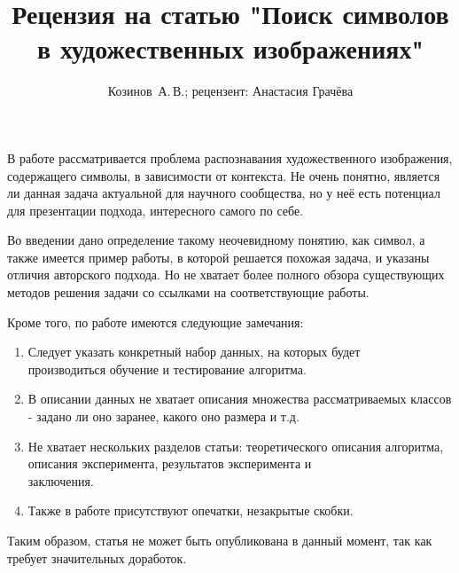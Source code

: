 \documentclass[12pt,twoside]{article}
\title{Рецензия на статью "Поиск символов в художественных изображениях"}
\author{Козинов~А.\,В.; рецензент: Анастасия Грачёва}
\begin{document}
	\maketitle
	В работе рассматривается проблема распознавания художественного изображения, содержащего символы, в зависимости от контекста. Не очень понятно, является ли данная задача актуальной для научного сообщества, но у неё есть потенциал для презентации подхода, интересного самого по себе.
	
	Во введении дано определение такому неочевидному понятию, как символ, а также имеется
	пример работы, в которой решается похожая задача, и указаны отличия авторского подхода.  Но не хватает более полного обзора существующих методов решения задачи со ссылками на соответствующие работы.
	
	Кроме того, по работе имеются следующие замечания:
	\begin{enumerate}
	\item Следует указать конкретный набор данных, на которых будет \\
	производиться обучение и
	тестирование алгоритма.
	\item В описании данных не хватает описания множества 
	рассматриваемых классов - задано ли оно заранее, какого 
	оно размера и т.д.
	\item Не хватает нескольких разделов статьи: теоретического описания алгоритма, описания
	эксперимента, результатов эксперимента и \\
	заключения.
	\item Также в работе присутствуют опечатки, незакрытые скобки.
	
	\end{enumerate}

	Таким образом, статья не может быть опубликована в данный момент, так как требует значительных доработок.
	
\end{document}
